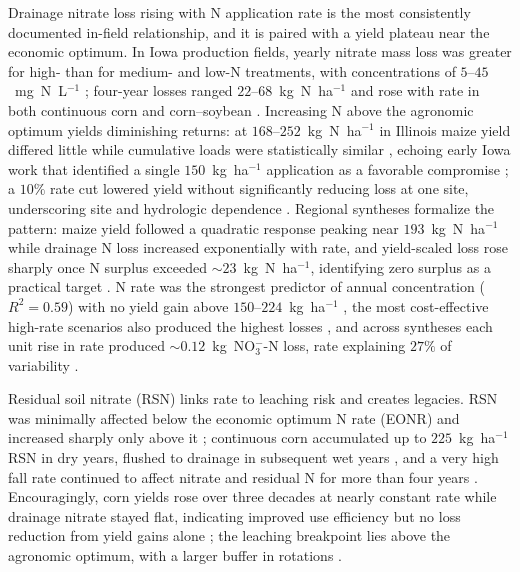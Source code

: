 \documentclass[11pt]{article}
\begin{document}
Drainage nitrate loss rising with N application rate is the most consistently
documented in-field relationship, and it is paired with a yield plateau near
the economic optimum. In Iowa production fields, yearly nitrate mass loss was
greater for high- than for medium- and low-N treatments, with concentrations
of $5$--$45$~mg~N~L$^{-1}$ \parencite{Jaynes2001}; four-year losses ranged
$22$--$68$~kg~N~ha$^{-1}$ and rose with rate in both continuous corn and
corn--soybean \parencite{Helmers2012b}. Increasing N above the agronomic
optimum yields diminishing returns: at $168$--$252$~kg~N~ha$^{-1}$ in
Illinois maize yield differed little while cumulative loads were
statistically similar \parencite{Li2023b}, echoing early Iowa work that
identified a single $150$~kg~ha$^{-1}$ application as a favorable compromise
\parencite{Azevedo1997}; a $10\%$ rate cut lowered yield without significantly
reducing loss at one site, underscoring site and hydrologic dependence
\parencite{Gentry2024}. Regional syntheses formalize the pattern: maize yield
followed a quadratic response peaking near $193$~kg~N~ha$^{-1}$ while drainage
N loss increased exponentially with rate, and yield-scaled loss rose sharply
once N surplus exceeded $\sim23$~kg~N~ha$^{-1}$, identifying zero surplus as a
practical target \parencite{Zhao2016}. N rate was the strongest predictor of
annual concentration ($R^2=0.59$) with no yield gain above
$150$--$224$~kg~ha$^{-1}$ \parencite{Hertzberger2019}, the most cost-effective
high-rate scenarios also produced the highest losses \parencite{Liu2021}, and
across syntheses each unit rise in rate produced $\sim0.12$~kg~NO$_3^-$-N
loss, rate explaining $27\%$ of variability
\parencite{Chatterjee2020b,Christianson2015b,Ritter2015}.

Residual soil nitrate (RSN) links rate to leaching risk and creates
legacies. RSN was minimally affected below the economic optimum N rate (EONR)
and increased sharply only above it \parencite{Bandura2025}; continuous corn
accumulated up to $225$~kg~ha$^{-1}$ RSN in dry years, flushed to drainage in
subsequent wet years \parencite{Randall2001}, and a very high fall rate
continued to affect nitrate and residual N for more than four years
\parencite{Jaynes2015}. Encouragingly, corn yields rose over three decades at
nearly constant rate while drainage nitrate stayed flat, indicating improved
use efficiency but no loss reduction from yield gains alone
\parencite{Clifford2023}; the leaching breakpoint lies above the agronomic
optimum, with a larger buffer in rotations \parencite{Pasley2021}.
\end{document}
